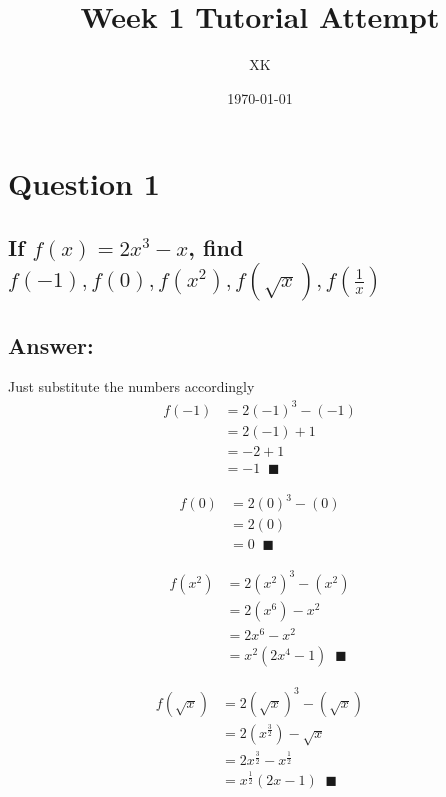 \documentclass[17 pt]{extarticle}
\title{Week 1 Tutorial Attempt}
\author{XK}
\date{\today}
\begin{document}
\maketitle

\tableofcontents

\newpage
\section{Question 1}

\subsection*{If $f(x) = 2x^3-x$, find $f(-1),f(0),f(x^2),f(\sqrt x), f(\frac{1}{x})$}
\vspace{10mm}
\subsection*{Answer:}

Just substitute the numbers accordingly
\begin{equation*}
\begin{split}
    f(-1) &= 2(-1)^3 - (-1) \\
    & = 2(-1) + 1 \\
    &= -2 + 1 \\
    &= -1 \; \; \blacksquare
\end{split}
\end{equation*}

\begin{equation*}
    \begin{split}
        f(0) &= 2(0)^3 - (0) \\
        & = 2(0) \\
        &= 0 \; \; \blacksquare
    \end{split}
    \end{equation*}

\begin{equation*}
        \begin{split}
            f(x^2) &= 2(x^2)^3 - (x^2) \\
            & = 2(x^6) - x^2 \\
            &= 2x^6 - x^2 \\
            &= x^2(2x^4 - 1) \; \; \blacksquare
        \end{split}
\end{equation*}

\begin{equation*}
    \begin{split}
        f(\sqrt x) &= 2(\sqrt x)^3 - (\sqrt x) \\
        & = 2(x^ \frac{3}{2}) - \sqrt x \\
        &= 2x^ \frac{3}{2} - x^ \frac{1}{2} \\
        &= x^ \frac{1}{2} (2x - 1) \; \; \blacksquare
    \end{split}
\end{equation*}
\end{document}
